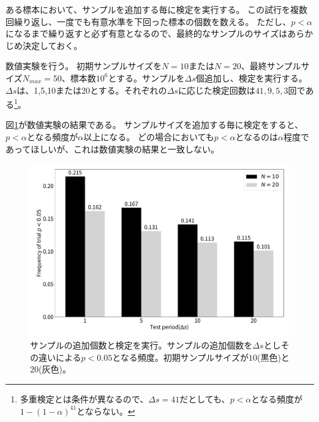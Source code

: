 ある標本において、サンプルを追加する毎に検定を実行する。
この試行を複数回繰り返し、一度でも有意水準を下回った標本の個数を数える。
ただし、$p<\alpha$になるまで繰り返すと必ず有意となるので、最終的なサンプルのサイズはあらかじめ決定しておく。

数値実験を行う。
初期サンプルサイズを$N=10$または$N=20$、最終サンプルサイズ$N_{max}=50$、標本数$10^6$とする。サンプルを$\Delta s$個追加し、検定を実行する。
$\Delta s$は、1,5,10または20とする。それぞれの$\Delta s$に応じた検定回数は$41,9,5,3$回である\footnote{多重検定とは条件が異なるので、$\Delta s=41$だとしても、$p<\alpha$となる頻度が$1-(1-\alpha)^{41}$とならない。}。


図\ref{fig:multiple_test_additional_sample}が数値実験の結果である。
サンプルサイズを追加する毎に検定をすると、$p<\alpha$となる頻度が$\alpha$以上になる。
どの場合においても$p<\alpha$となるのは$\alpha$程度であってほしいが、これは数値実験の結果と一致しない。

\begin{figure}
  \begin{center}
    \includegraphics[width=15cm]{./image/04_/multiple_test_additional_sample.pdf}
    \caption{サンプルの追加個数と検定を実行。サンプルの追加個数を$\Delta s$としその違いによる$p<0.05$となる頻度。初期サンプルサイズが$10$(黒色)と$20$(灰色)。}
        \label{fig:multiple_test_additional_sample}
    \end{center}
\end{figure}

